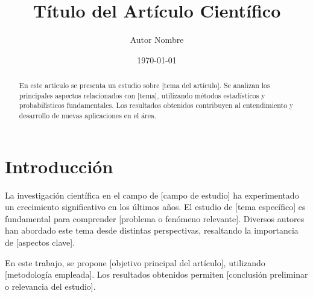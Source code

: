 \documentclass[12pt]{article}
\title{Título del Artículo Científico}
\author{Autor Nombre}
\date{\today}
\begin{document}
\maketitle

\begin{abstract}
En este artículo se presenta un estudio sobre [tema del artículo]. Se analizan los principales aspectos relacionados con [tema], utilizando métodos estadísticos y probabilísticos fundamentales. Los resultados obtenidos contribuyen al entendimiento y desarrollo de nuevas aplicaciones en el área.
\end{abstract}

\section{Introducción}
La investigación científica en el campo de [campo de estudio] ha experimentado un crecimiento significativo en los últimos años. El estudio de [tema específico] es fundamental para comprender [problema o fenómeno relevante]. Diversos autores han abordado este tema desde distintas perspectivas, resaltando la importancia de [aspectos clave].

En este trabajo, se propone [objetivo principal del artículo], utilizando [metodología empleada]. Los resultados obtenidos permiten [conclusión preliminar o relevancia del estudio].

\end{document}
